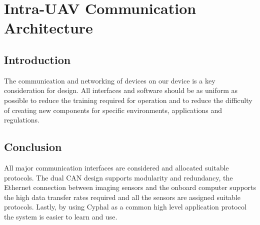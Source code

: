 \newpage
{}
\section{Intra-UAV Communication Architecture} \label{Intra Communication}

\subsection{Introduction}\label{sub_section:tgt_intra_com_intro}
The communication and networking of devices on our device is a key consideration for design. All interfaces and software should be as uniform as possible to reduce the training required for operation and to reduce the difficulty of creating new components for specific environments, applications and regulations.




\subsection{Conclusion}
All major communication interfaces are considered and allocated suitable protocols. The dual \gls{CAN} design supports modularity and redundancy, the Ethernet connection between imaging sensors and the onboard computer supports the high data transfer rates required and all the sensors are assigned suitable protocols. Lastly, by using Cyphal as a common high level application protocol the system is easier to learn and use.